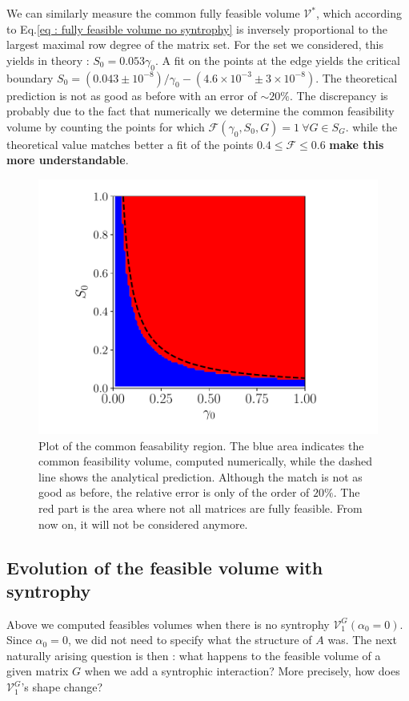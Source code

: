 \documentclass[12pt, titlepage]{report}
\begin{document}
We can similarly measure the common fully feasible volume $\mathcal{V^*}$, which according to Eq.\eqref{eq : fully feasible volume no syntrophy} is inversely proportional to the largest maximal row degree of the matrix set. For the set we considered, this yields in theory : $S_0 = 0.053 \gamma_0$. A fit on the points at the edge yields the critical boundary $S_0 = (0.043 \pm 10^{-8})/\gamma_0 - (4.6 \times 10^{-3} \pm 3 \times 10^{-8})$. The theoretical prediction is not as good as before with an error of $\sim 20 \%$. The discrepancy is probably due to the fact that numerically we determine the common feasibility volume by counting the points for which $\mathcal{F}(\gamma_0, S_0, G)=1 \ \forall G \in S_G$.
while the theoretical value matches better a fit of the points $0.4 \leq \mathcal{F} \leq 0.6$ \textbf{make this more understandable}.
\begin{figure}[h!]
\centering
\includegraphics[width=0.7\linewidth]{common_feasibility_volume_no_syntrophy}
\caption{Plot of the common feasability region. The blue area indicates the common feasibility volume, computed numerically, while the dashed line shows the analytical prediction. Although the match is not as good as before, the relative error is only of the order of $20 \%$. The red part is the area where not all matrices are fully feasible. From now on, it will not be considered anymore.}
\label{fig : common feasible volume}
\end{figure}
\FloatBarrier
\subsection{Evolution of the feasible volume with syntrophy}

Above we computed feasibles volumes when there is no syntrophy \ie $\mathcal{V}^{G}_1(\alpha_0=0)$. Since $\alpha_0=0$, we did not need to specify what the structure of $A$ was. The next naturally arising question is then : what happens to the feasible volume of a given matrix $G$ when we add a syntrophic interaction? More precisely, how does $\mathcal{V}^G_1$'s shape change?
\end{document}
